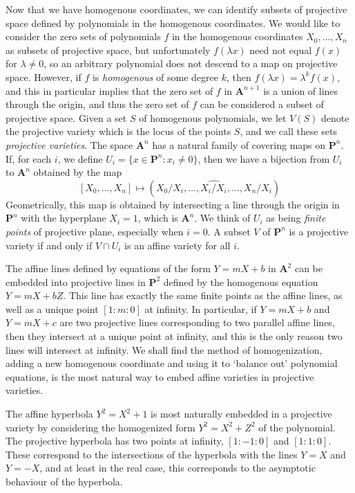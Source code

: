 Now that we have homogenous coordinates, we can identify subsets of projective space defined by polynomials in the homogenous coordinates. We would like to consider the zero sets of polynomials $f$ in the homogenous coordinates $X_0, \dots, X_n$ as subsets of projective space, but unfortunately $f(\lambda x)$ need not equal $f(x)$ for $\lambda \neq 0$, so an arbitrary polynomial does not descend to a map on projective space. However, if $f$ is {\it homogenous} of some degree $k$, then $f(\lambda x) = \lambda^k f(x)$, and this in particular implies that the zero set of $f$ in $\mathbf{A}^{n+1}$ is a union of lines through the origin, and thus the zero set of $f$ can be considered a subset of projective space. Given a set $S$ of homogenous polynomials, we let $V(S)$ denote the projective variety which is the locus of the points $S$, and we call these sets \emph{projective varieties}. The space $\mathbf{A}^n$ has a natural family of covering maps on $\mathbf{P}^n$. If, for each $i$, we define $U_i = \{ x \in \mathbf{P}^n: x_i \neq 0 \}$, then we have a bijection from $U_i$ to $\mathbf{A}^n$ obtained by the map
%
\[ [X_0, \dots, X_n] \mapsto (X_0/X_i, \dots, \widehat{X_i/X_i} ,\dots, X_n/X_i) \]
%
Geometrically, this map is obtained by intersecting a line through the origin in $\mathbf{P}^n$ with the hyperplane $X_i = 1$, which is $\mathbf{A}^n$. We think of $U_i$ as being {\it finite points} of projective plane, especially when $i = 0$. A subset $V$ of $\mathbf{P}^n$ is a projective variety if and only if $V \cap U_i$ is an affine variety for all $i$.

\begin{example}
    The affine lines defined by equations of the form $Y = mX + b$ in $\mathbf{A}^2$ can be embedded into projective lines in $\mathbf{P}^2$ defined by the homogenous equation $Y = mX + bZ$. This line has exactly the same finite points as the affine lines, as well as a unique point $[1:m:0]$ at infinity. In particular, if $Y = mX + b$ and $Y = mX + c$ are two projective lines corresponding to two parallel affine lines, then they intersect at a unique point at infinity, and this is the only reason two lines will intersect at infinity. We shall find the method of homogenization, adding a new homogenous coordinate and using it to `balance out' polynomial equations, is the most natural way to embed affine varieties in projective varieties.
\end{example}

\begin{example}
    The affine hyperbola $Y^2 = X^2 + 1$ is most naturally embedded in a projective variety by considering the homogenized form $Y^2 = X^2 + Z^2$ of the polynomial. The projective hyperbola has two points at infinity, $[1:-1:0]$ and $[1:1:0]$. These correspond to the intersections of the hyperbola with the lines $Y = X$ and $Y = -X$, and at least in the real case, this corresponds to the asymptotic behaviour of the hyperbola.
\end{example}

